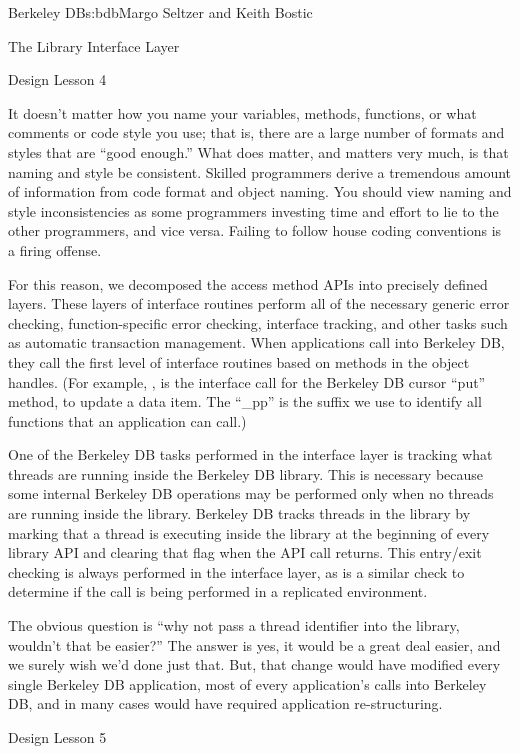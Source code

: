 \begin{aosachapter}{Berkeley DB}{s:bdb}{Margo Seltzer and Keith Bostic}
\begin{aosasect1}{The Library Interface Layer}
\begin{aosabox}{Design Lesson 4}

It doesn't matter how you name your variables, methods, functions, or
what comments or code style you use; that is, there are a large number
of formats and styles that are ``good enough.'' What does matter, and
matters very much, is that naming and style be consistent. Skilled
programmers derive a tremendous amount of information from code format
and object naming. You should view naming and style inconsistencies as
some programmers investing time and effort to lie to the other
programmers, and vice versa. Failing to follow house coding
conventions is a firing offense.

\end{aosabox}

For this reason, we decomposed the access method APIs into precisely
defined layers. These layers of interface routines perform all of the
necessary generic error checking, function-specific error checking,
interface tracking, and other tasks such as automatic transaction
management. When applications call into Berkeley DB, they call the
first level of interface routines based on methods in the object
handles. (For example, , is the interface call
for the Berkeley DB cursor ``put'' method, to update a data item. The
``\_pp'' is the suffix we use to identify all functions that an
application can call.) 

One of the Berkeley DB tasks performed in the interface layer is
tracking what threads are running inside the Berkeley DB library. This
is necessary because some internal Berkeley DB operations may be
performed only when no threads are running inside the
library. Berkeley DB tracks threads in the library by marking that a
thread is executing inside the library at the beginning of every
library API and clearing that flag when the API call returns. This
entry/exit checking is always performed in the interface layer, as is
a similar check to determine if the call is being performed in a
replicated environment.

The obvious question is ``why not pass a thread identifier into the
library, wouldn't that be easier?'' The answer is yes, it would be a
great deal easier, and we surely wish we'd done just that. But, that
change would have modified every single Berkeley DB application, most
of every application's calls into Berkeley DB, and in many cases would
have required application re-structuring. 

\begin{aosabox}{Design Lesson 5}


\end{aosabox}
\end{aosasect1}
\end{aosachapter}
